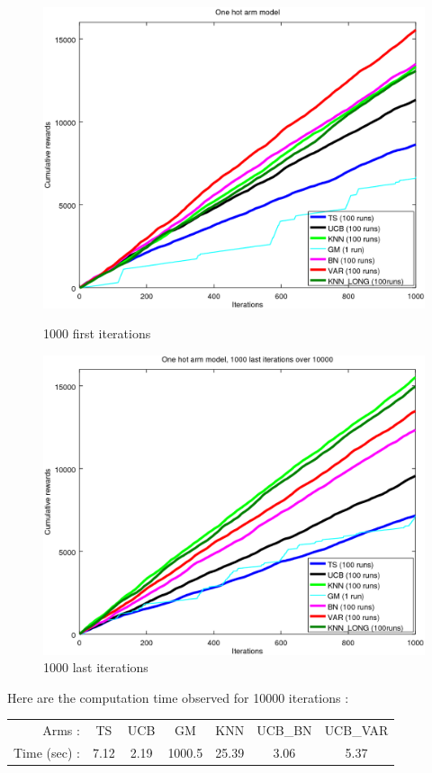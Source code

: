 \documentclass{article} %
\begin{document}
\begin{figure}[h]
	\begin{minipage}[b]{.49\linewidth}
		\includegraphics[width=1.0\textwidth]{begin_1000it.png}
		\caption{1000 first iterations}
	\end{minipage}
	\hfill
	\begin{minipage}[b]{0.48\linewidth}
		\includegraphics[width=1.0\textwidth]{last_1000it.png}
		\caption{1000 last iterations}
	\end{minipage}
	\label{fig:f}
\end{figure}


Here are the computation time observed for 10000 iterations : 
\begin{center}
	\begin{tabular}{rcccccc}
		Arms : & TS & UCB & GM & KNN & UCB\_BN & UCB\_VAR \\
		Time (sec) : & 7.12 & 2.19 & 1000.5 & 25.39 & 3.06 & 5.37
	\end{tabular}
\end{center}
\end{document}
